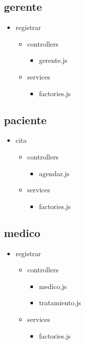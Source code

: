 	\subsection{gerente}
		\begin{itemize}
		\item registrar
		\begin{itemize}
			\item controllers
			\begin{itemize}
				\item gerente.js
			\end{itemize}
			\item services
			\begin{itemize}
				\item factories.js
			\end{itemize}
		\end{itemize}
	\end{itemize}
	\subsection{paciente}
		\begin{itemize}
		\item cita
		\begin{itemize}
			\item controllers
			\begin{itemize}
				\item agendar.js
			\end{itemize}
			\item services
			\begin{itemize}
				\item factories.js
			\end{itemize}
		\end{itemize}
	\end{itemize}
	\subsection{medico}
		\begin{itemize}
		\item registrar
		\begin{itemize}
			\item controllers
			\begin{itemize}
				\item medico.js
				\item tratamiento.js
			\end{itemize}
			\item services
			\begin{itemize}
				\item factories.js
			\end{itemize}
		\end{itemize}
	\end{itemize}
